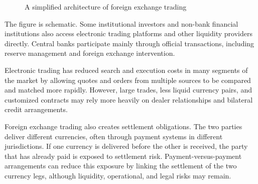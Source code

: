 \begin{figure}[H]
\centering


\caption{A simplified architecture of foreign exchange trading}
\label{fig:ch10-fx-market-architecture}
\end{figure}

The figure is schematic. Some institutional investors
and non-bank financial institutions also access
electronic trading platforms and other liquidity
providers directly. Central banks participate mainly
through official transactions, including reserve
management and foreign exchange intervention.

Electronic trading has reduced search and execution
costs in many segments of the market by allowing
quotes and orders from multiple sources to be compared
and matched more rapidly. However, large trades,
less liquid currency pairs, and customized contracts
may rely more heavily on dealer relationships and
bilateral credit arrangements.

Foreign exchange trading also creates settlement obligations. The two parties deliver different currencies, often through payment systems in different jurisdictions. If one currency is delivered before the other is received, the party that has already paid is exposed to settlement risk. Payment-versus-payment arrangements can reduce this exposure by linking the settlement of the two currency legs, although liquidity, operational, and legal risks may remain.

